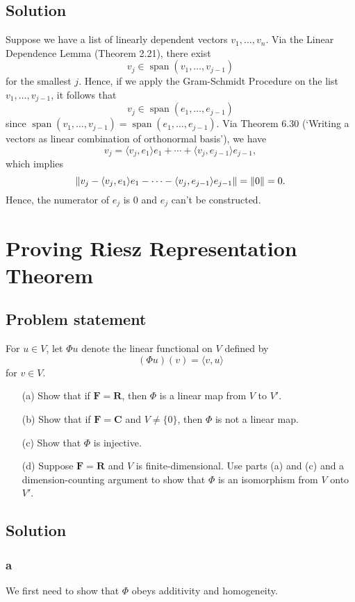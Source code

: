 \documentclass{article}
\begin{document}
\subsection*{Solution}
Suppose we have a list of linearly dependent vectors $v_1,\ldots,v_n$. 
Via the Linear Dependence Lemma (Theorem 2.21), there exist 
\[v_j\in\operatorname{span}(v_1,\ldots,v_{j-1})\]
for the smallest $j$. 
Hence, if we apply the Gram-Schmidt Procedure on the list $v_1,\ldots,v_{j-1}$, it follows that 
\[v_j\in\operatorname{span}(e_1,\ldots,e_{j-1})\]
since $\operatorname{span}(v_1,\ldots,v_{j-1})=\operatorname{span}(e_1,\ldots,e_{j-1})$.
Via Theorem 6.30 (`Writing a vectors as linear combination of orthonormal basis'), we have
\[v_j=\langle v_j,e_1\rangle e_1+\cdots+\langle v_j,e_{j-1}\rangle e_{j-1},\]
which implies 
\[\lVert v_j-\langle v_j,e_1\rangle e_1-\cdots-\langle v_j,e_{j-1}\rangle e_{j-1}\rVert=\lVert0\rVert=0.\]
Hence, the numerator of $e_j$ is $0$ and $e_j$ can't be constructed.

\clearpage

\renewcommand{\thesection}{17}
\section{Proving Riesz Representation Theorem}
\subsection*{Problem statement}
For $u\in V$, let $\Phi u$ denote the linear functional on $V$ defined by
\[(\Phi u)(v)=\langle v,u \rangle\]
for $v\in V$.
\begin{enumerate}
    \item[(a)] Show that if $\mathbf{F}=\mathbf{R}$, then $\Phi$ is a linear map from $V$ to $V'$.
    \item[(b)] Show that if $\mathbf{F}=\mathbf{C}$ and $V\neq \{0\}$, then $\Phi$ is not a linear map.
    \item[(c)] Show that $\Phi$ is injective.
    \item[(d)] Suppose $\mathbf{F}=\mathbf{R}$ and $V$ is finite-dimensional. Use parts (a) and (c) and a dimension-counting argument to show that $\Phi$ is an isomorphism from $V$ onto $V'$.
\end{enumerate}

\subsection*{Solution}
\subsubsection*{a}
We first need to show that $\Phi$ obeys additivity and homogeneity.
\end{document}

